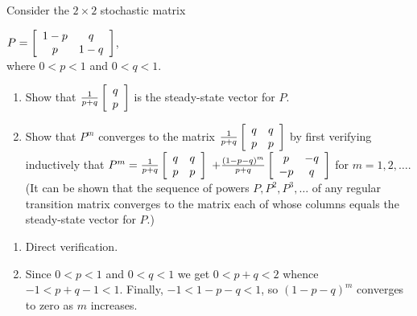 \begin{multicols}{2}
\begin{ex}
Consider the $2 \times 2$ stochastic matrix

$P = \left[ \begin{array}{cc}
1 - p & q \\
p & 1 - q
\end{array} \right]$, \\
 where $0 < p < 1$ and $0 < q < 1$.


\begin{enumerate}[label={\alph*.}]
\item Show that $\tfrac{1}{p + q} \left[ \begin{array}{r}
q \\
p
\end{array} \right]$
 is the steady-state vector for $P$.

\item Show that $P^{m}$ converges to the matrix $\tfrac{1}{p + q} \left[ \begin{array}{cc}
q & q \\
p & p
\end{array} \right]$ by first verifying inductively that
$P^m = \tfrac{1}{p + q} \left[ \begin{array}{cc}
q & q \\
p & p
\end{array} \right] $ $+ \tfrac{(1 - p - q)^m}{p + q} \left[ \begin{array}{cc}
p & -q \\ 
-p & q
\end{array} \right]$ for $m = 1, 2, \dots$. (It can be shown that the sequence of powers $P, P^{2}, P^{3}, \dots$ of any regular transition matrix converges to the matrix each of whose columns equals the steady-state vector for $P$.)

\end{enumerate}
\begin{sol}
\begin{enumerate}[label={\alph*.}]
\item  Direct verification.

\item  Since $0 < p < 1$ and $0 < q < 1$ we get $0 < p + q < 2$ whence $-1 < p + q - 1 < 1$. Finally, $-1 < 1 - p - q < 1$, so $(1 - p - q)^{m}$ converges to zero as $m$ increases.

\end{enumerate}
\end{sol}
\end{ex}


\end{multicols}
